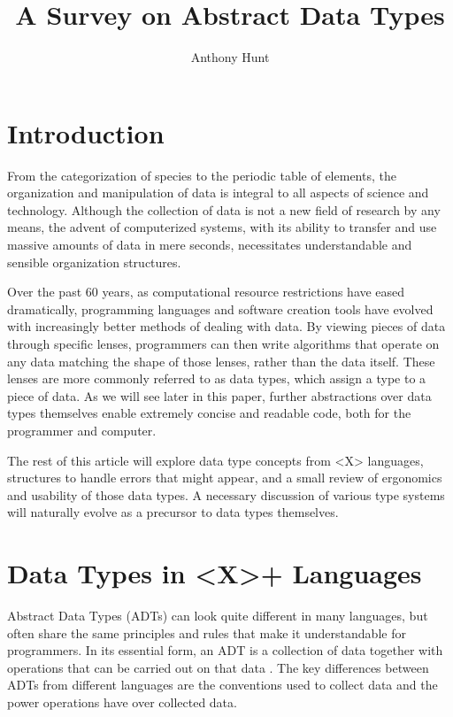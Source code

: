 \documentclass{article}
\title{A Survey on Abstract Data Types}
\author{Anthony Hunt}
\begin{document}
\maketitle

\section{Introduction}

From the categorization of species to the periodic table of elements, the organization and manipulation
of data is integral to all aspects of science and technology. Although the collection of data is not a
new field of research by any means, the advent of computerized systems, with its ability to transfer and use
massive amounts of data in mere seconds, necessitates understandable and sensible organization structures.

Over the past 60 years, as computational resource restrictions have eased dramatically,
programming languages and software creation tools have evolved with increasingly better methods of dealing with data.
By viewing pieces of data through specific lenses, programmers can then write algorithms that operate on
any data matching the shape of those lenses, rather than the data itself. These lenses are more commonly referred to as
data types, which assign a type to a piece of data. As we will see later in this paper,
further abstractions over data types themselves enable extremely concise and readable code,
both for the programmer and computer.

The rest of this article will explore data type concepts from <X> languages, %
structures to handle errors that might appear, and a small review of ergonomics and usability of those data types.
A necessary discussion of various type systems will naturally evolve as a precursor to data types themselves.

\section{Data Types in <X>+ Languages} %

Abstract Data Types (ADTs) can look quite different in many languages, but often share the same principles and rules
that make it understandable for programmers. In its essential form, an ADT is a collection of data together with
operations that can be carried out on that data \cite{ADTspec}. The key differences between ADTs from different languages
are the conventions used to collect data and the power operations have over collected data.
\end{document}
